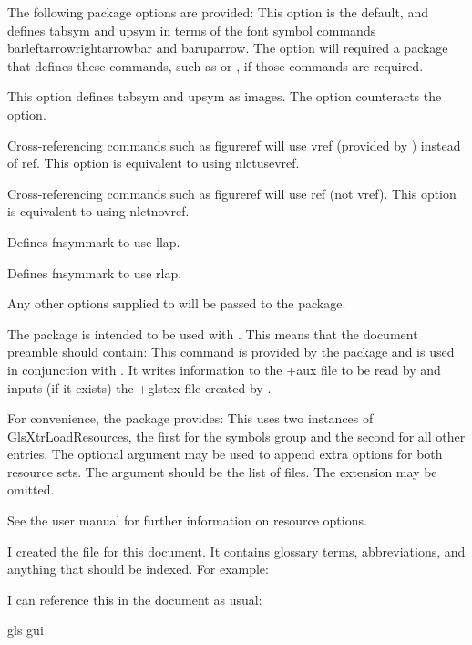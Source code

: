 \documentclass[toc=listof]{scrreport}
\begin{document}
The following  package options are provided:
This option is the default, and defines \gls{tabsym} and \gls{upsym} in terms of
the font symbol commands \gls{barleftarrowrightarrowbar}
and \gls{baruparrow}. The  option will required a package that defines
these commands, such as  or , if those commands are required.

This option  defines \gls{tabsym} and \gls{upsym} as images.
The  option counteracts the  option.

Cross-referencing commands such as \gls{figureref} will use
\gls{vref} (provided by ) instead of \gls{ref}.
This option is equivalent to using \gls{nlctusevref}.

Cross-referencing commands such as \gls{figureref} will use
\gls{ref} (not \gls{vref}).
This option is equivalent to using \gls{nlctnovref}.

Defines \gls{fnsymmark} to use \gls{llap}.

Defines \gls{fnsymmark} to use \gls{rlap}.

Any other options supplied to  will be passed to
the  package.

The  package is intended to be used with . This means
that the document preamble should contain:
This command is provided by the  package and is used 
in conjunction with . It writes information
to the \ext+{aux} file to be read by  and inputs
(if it exists) the \ext+{glstex} file created by .

For convenience, the  package provides:
This uses two instances of \gls{GlsXtrLoadResources}, the first for
the symbols group and the second for all other entries.
The optional argument may be used to append extra options for both
resource sets. The  argument should be the list of
 files. The  extension may be omitted.

\begin{information}
See the  user manual for further information on resource options.
\end{information}

I created the file  
for this document. It contains glossary terms, abbreviations, and
anything that should be indexed. For example:
\begin{codebox}
\end{codebox} 
I can reference this in the document as usual:
\begin{coderesult}
\gls{gls}
\tcblower
\gls{gui}
\end{coderesult}
\end{document}
